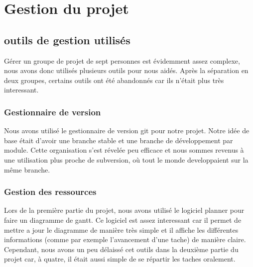 \chapter{Gestion du projet}

\section{outils de gestion utilisés}

Gérer un groupe de projet de sept personnes est évidemment assez complexe, nous avons donc utilisés plusieurs outils pour nous aidés. Après la séparation en deux groupes, certains outils ont été abandonnés car ils n'était plus très interessant.

\subsection{Gestionnaire de version}

Nous avons utilisé le gestionnaire de version git pour notre projet. Notre idée de base était d'avoir une branche stable et une branche de développement par module. Cette organisation s'est révelée peu efficace et nous sommes revenus à une utilisation plus proche de subversion, où tout le monde developpaient sur la même branche. 

\subsection{Gestion des ressources}

Lors de la première partie du projet, nous avons utilisé le logiciel planner pour faire un diagramme de gantt. Ce logiciel est assez interessant car il permet de mettre a jour le diagramme de manière très simple et il affiche les différentes informations (comme par exemple l'avancement d'une tache) de manière claire.
Cependant, nous avons un peu délaissé cet outils dans la deuxième partie du projet car, à quatre, il était aussi simple de se répartir les taches oralement.


